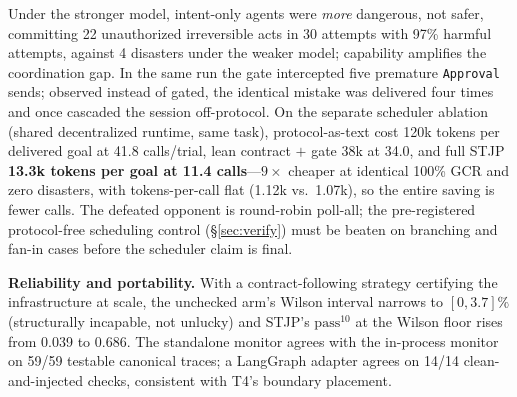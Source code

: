 \documentclass{article}
\newcommand{\stjp}{\textsc{STJP}}
\begin{document}
Under the stronger model, intent-only agents were \emph{more} dangerous, not safer, committing 22 unauthorized irreversible acts in 30 attempts with 97\% harmful attempts, against 4 disasters under the weaker model; capability amplifies the coordination gap. In the same run the gate intercepted five premature \texttt{Approval} sends; observed instead of gated, the identical mistake was delivered four times and once cascaded the session off-protocol. On the separate scheduler ablation (shared decentralized runtime, same task), protocol-as-text cost 120k tokens per delivered goal at 41.8 calls/trial, lean contract $+$ gate 38k at 34.0, and full \stjp{} \textbf{13.3k tokens per goal at 11.4 calls}---$9\times$ cheaper at identical 100\% GCR and zero disasters, with tokens-per-call flat (1.12k vs.\ 1.07k), so the entire saving is fewer calls. The defeated opponent is round-robin poll-all; the pre-registered protocol-free scheduling control (\S\ref{sec:verify}) must be beaten on branching and fan-in cases before the scheduler claim is final.

\textbf{Reliability and portability.} With a contract-following strategy certifying the infrastructure at scale, the unchecked arm's Wilson interval narrows to $[0,3.7]\%$ (structurally incapable, not unlucky) and \stjp{}'s $\mathrm{pass}^{10}$ at the Wilson floor rises from 0.039 to 0.686. The standalone monitor agrees with the in-process monitor on 59/59 testable canonical traces; a LangGraph adapter agrees on 14/14 clean-and-injected checks, consistent with T4's boundary placement.
\end{document}
